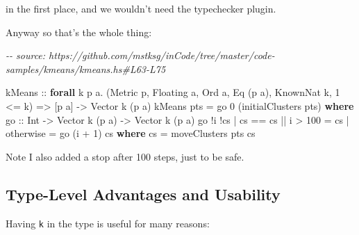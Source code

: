 \documentclass[]{article}
\newenvironment{Shaded}{}{}
\newcommand{\CommentTok}[1]{\textcolor[rgb]{0.38,0.63,0.69}{\textit{#1}}}
\newcommand{\DataTypeTok}[1]{\textcolor[rgb]{0.56,0.13,0.00}{#1}}
\newcommand{\DecValTok}[1]{\textcolor[rgb]{0.25,0.63,0.44}{#1}}
\newcommand{\FunctionTok}[1]{\textcolor[rgb]{0.02,0.16,0.49}{#1}}
\newcommand{\KeywordTok}[1]{\textcolor[rgb]{0.00,0.44,0.13}{\textbf{#1}}}
\newcommand{\NormalTok}[1]{#1}
\newcommand{\OperatorTok}[1]{\textcolor[rgb]{0.40,0.40,0.40}{#1}}
\newcommand{\OtherTok}[1]{\textcolor[rgb]{0.00,0.44,0.13}{#1}}
\begin{document}
in the first place, and we wouldn't need the typechecker plugin.

Anyway so that's the whole thing:

\begin{Shaded}
\begin{Highlighting}[]
\CommentTok{{-}{-} source: https://github.com/mstksg/inCode/tree/master/code{-}samples/kmeans/kmeans.hs\#L63{-}L75}

\OtherTok{kMeans ::}
  \KeywordTok{forall}\NormalTok{ k p a}\OperatorTok{.}
\NormalTok{  (}\DataTypeTok{Metric}\NormalTok{ p, }\DataTypeTok{Floating}\NormalTok{ a, }\DataTypeTok{Ord}\NormalTok{ a, }\DataTypeTok{Eq}\NormalTok{ (p a), }\DataTypeTok{KnownNat}\NormalTok{ k, }\DecValTok{1} \OperatorTok{\textless{}=}\NormalTok{ k) }\OtherTok{=\textgreater{}}
\NormalTok{  [p a] }\OtherTok{{-}\textgreater{}}
  \DataTypeTok{Vector}\NormalTok{ k (p a)}
\NormalTok{kMeans pts }\OtherTok{=}\NormalTok{ go }\DecValTok{0}\NormalTok{ (initialClusters pts)}
  \KeywordTok{where}
\OtherTok{    go ::} \DataTypeTok{Int} \OtherTok{{-}\textgreater{}} \DataTypeTok{Vector}\NormalTok{ k (p a) }\OtherTok{{-}\textgreater{}} \DataTypeTok{Vector}\NormalTok{ k (p a)}
\NormalTok{    go }\OperatorTok{!}\NormalTok{i }\OperatorTok{!}\NormalTok{cs}
      \OperatorTok{|}\NormalTok{ cs }\OperatorTok{==}\NormalTok{ cs\textquotesingle{} }\OperatorTok{||}\NormalTok{ i }\OperatorTok{\textgreater{}} \DecValTok{100} \OtherTok{=}\NormalTok{ cs}
      \OperatorTok{|} \FunctionTok{otherwise} \OtherTok{=}\NormalTok{ go (i }\OperatorTok{+} \DecValTok{1}\NormalTok{) cs\textquotesingle{}}
      \KeywordTok{where}
\NormalTok{        cs\textquotesingle{} }\OtherTok{=}\NormalTok{ moveClusters pts cs}
\end{Highlighting}
\end{Shaded}

Note I also added a stop after 100 steps, just to be safe.

\subsection{Type-Level Advantages and
Usability}\label{type-level-advantages-and-usability}

Having \texttt{k} in the type is useful for many reasons:
\end{document}
